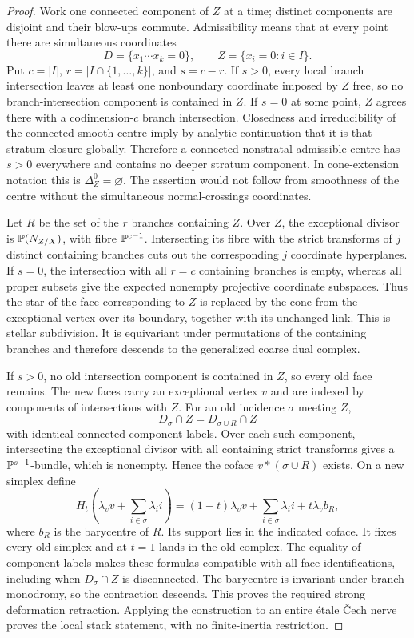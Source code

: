 \begin{proof}
Work one connected component of $Z$ at a time; distinct components are disjoint and their blow-ups commute. Admissibility means that at every point there are simultaneous coordinates
\[
 D=\{x_1\cdots x_k=0\},\qquad Z=\{x_i=0:i\in I\}.
\]
Put $c=|I|$, $r=|I\cap\{1,\ldots,k\}|$, and $s=c-r$. If $s>0$, every local branch intersection leaves at least one nonboundary coordinate imposed by $Z$ free, so no branch-intersection component is contained in $Z$. If $s=0$ at some point, $Z$ agrees there with a codimension-$c$ branch intersection. Closedness and irreducibility of the connected smooth centre imply by analytic continuation that it is that stratum closure globally. Therefore a connected nonstratal admissible centre has $s>0$ everywhere and contains no deeper stratum component. In cone-extension notation this is $\Delta_Z^0=\varnothing$. The assertion would not follow from smoothness of the centre without the simultaneous normal-crossings coordinates.

Let $R$ be the set of the $r$ branches containing $Z$. Over $Z$, the exceptional divisor is $\mathbb P(N_{Z/X})$, with fibre $\mathbb P^{c-1}$. Intersecting its fibre with the strict transforms of $j$ distinct containing branches cuts out the corresponding $j$ coordinate hyperplanes. If $s=0$, the intersection with all $r=c$ containing branches is empty, whereas all proper subsets give the expected nonempty projective coordinate subspaces. Thus the star of the face corresponding to $Z$ is replaced by the cone from the exceptional vertex over its boundary, together with its unchanged link. This is stellar subdivision. It is equivariant under permutations of the containing branches and therefore descends to the generalized coarse dual complex.

If $s>0$, no old intersection component is contained in $Z$, so every old face remains. The new faces carry an exceptional vertex $v$ and are indexed by components of intersections with $Z$. For an old incidence $\sigma$ meeting $Z$,
\[
 D_\sigma\cap Z=D_{\sigma\cup R}\cap Z
\]
with identical connected-component labels. Over each such component, intersecting the exceptional divisor with all containing strict transforms gives a $\mathbb P^{s-1}$-bundle, which is nonempty. Hence the coface $v*(\sigma\cup R)$ exists. On a new simplex define
\[
 H_t\left(\lambda_vv+\sum_{i\in\sigma}\lambda_i i\right)
 =(1-t)\lambda_vv+\sum_{i\in\sigma}\lambda_i i
       +t\lambda_v b_R,
\]
where $b_R$ is the barycentre of $R$. Its support lies in the indicated coface. It fixes every old simplex and at $t=1$ lands in the old complex. The equality of component labels makes these formulas compatible with all face identifications, including when $D_\sigma\cap Z$ is disconnected. The barycentre is invariant under branch monodromy, so the contraction descends. This proves the required strong deformation retraction. Applying the construction to an entire étale Čech nerve proves the local stack statement, with no finite-inertia restriction.


\end{proof}
